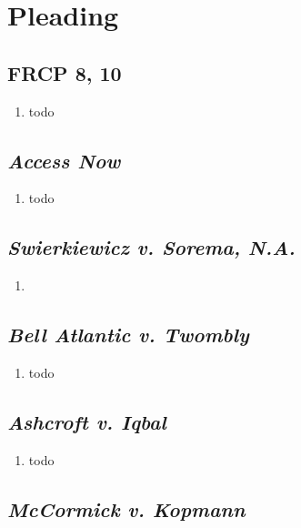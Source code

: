 \section{Pleading}

\subsection{FRCP 8, 10}

\begin{enumerate}
    \item todo
\end{enumerate}

\subsection{\emph{Access Now}}

\begin{enumerate}
    \item todo
\end{enumerate}

\subsection{\emph{Swierkiewicz v. Sorema, N.A.}}

\begin{enumerate}
    \item 
\end{enumerate}

\subsection{\emph{Bell Atlantic v. Twombly}}

\begin{enumerate}
    \item todo
\end{enumerate}

\subsection{\emph{Ashcroft v. Iqbal}}

\begin{enumerate}
    \item todo
\end{enumerate}

\subsection{\emph{McCormick v. Kopmann}}

